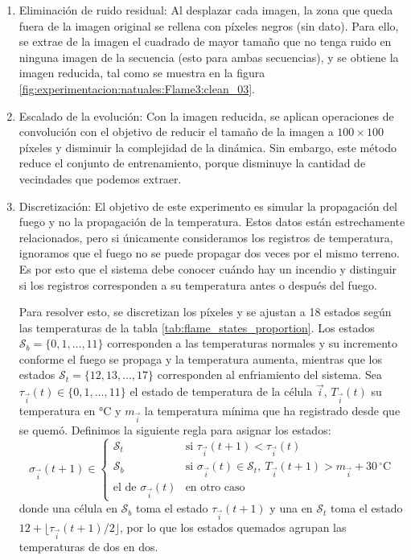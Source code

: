 \begin{enumerate}
	Sin embargo, las imágenes resultantes generan bordes negros que representan el movimiento de la imagen. Esto genera ruido en los bordes, lo que nos obliga a reducir el tamaño de los datos.
	
	\item Eliminación de ruido residual: Al desplazar cada imagen, la zona que queda fuera de la imagen original se rellena con píxeles negros (sin dato). Para ello, se extrae de la imagen el cuadrado de mayor tamaño que no tenga ruido en ninguna imagen de la secuencia (esto para ambas secuencias), y se obtiene la imagen reducida, tal como se muestra en la figura \ref{fig:experimentacion:natuales:Flame3:clean_03}.
	
	\item Escalado de la evolución: Con la imagen reducida, se aplican operaciones de convolución con el objetivo de reducir el tamaño de la imagen a $100 \times 100$ píxeles y disminuir la complejidad de la dinámica. Sin embargo, este método reduce el conjunto de entrenamiento, porque disminuye la cantidad de vecindades que podemos extraer. 
	
	 \item Discretización: El objetivo de este experimento es simular la propagación del fuego y no la propagación de la temperatura. Estos datos están estrechamente relacionados, pero si únicamente consideramos los registros de temperatura, ignoramos que el fuego no se puede propagar dos veces por el mismo terreno. Es por esto que el sistema debe conocer cuándo hay un incendio y distinguir si los registros corresponden a su temperatura antes o después del fuego. 
	 
	 Para resolver esto, se discretizan los píxeles y se ajustan a 18 estados según las temperaturas de la tabla \ref{tab:flame_states_proportion}. Los estados $ \mathcal{S}_b = \{0, 1, \dots, 11\}$ corresponden a las temperaturas normales y su incremento conforme el fuego se propaga y la temperatura aumenta, mientras que los estados $\mathcal{S}_t = \{12, 13, \dots, 17\}$ corresponden al enfriamiento del sistema. Sea $\tau_{\vec{i}}(t) \in \{0, 1, \dots, 11\}$ el estado de temperatura de la célula $\vec{i}$, $T_{\vec{i}}(t)$ su temperatura en °C y $m_{\vec{i}}$ la temperatura mínima que ha registrado desde que se quemó. Definimos la siguiente regla para asignar los estados:
	 \[
	 	\sigma_{\vec{i}}(t + 1) \in
	 	\begin{cases}
	 		\mathcal{S}_t & \text{si } \tau_{\vec{i}}(t + 1) < \tau_{\vec{i}}(t) \\
	 		\mathcal{S}_b & \text{si } \sigma_{\vec{i}}(t) \in \mathcal{S}_t,\ T_{\vec{i}}(t + 1) > m_{\vec{i}} + 30\,^\circ\mathrm{C} \\
	 		\text{el de } \sigma_{\vec{i}}(t) & \text{en otro caso}
	 	\end{cases}
	 \]
	 donde una célula en $\mathcal{S}_b$ toma el estado $\tau_{\vec{i}}(t + 1)$ y una en $\mathcal{S}_t$ toma el estado $12 + \lfloor \tau_{\vec{i}}(t + 1) / 2 \rfloor$, por lo que los estados quemados agrupan las temperaturas de dos en dos.


\end{enumerate}
